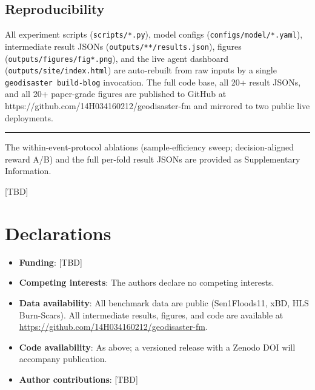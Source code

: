\documentclass[sn-nature,lineno]{sn-jnl}
\theoremstyle{thmstyleone}
\theoremstyle{thmstyletwo}
\theoremstyle{thmstylethree}
\begin{document}
\subsection{Reproducibility}\label{reproducibility}

All experiment scripts (\texttt{scripts/*.py}), model configs (\texttt{configs/model/*.yaml}),
intermediate result JSONs (\texttt{outputs/**/results.json}), figures
(\texttt{outputs/figures/fig*.png}), and the live agent dashboard
(\texttt{outputs/site/index.html}) are auto-rebuilt from raw inputs by a single
\texttt{geodisaster\ build-blog} invocation. The full code base, all 20+ result
JSONs, and all 20+ paper-grade figures are published to GitHub at
https://github.com/14H034160212/geodisaster-fm and mirrored to two public
live deployments.

\begin{center}\rule{0.5\linewidth}{0.5pt}\end{center}


\backmatter

The within-event-protocol ablations (sample-efficiency sweep;
decision-aligned reward A/B) and the full per-fold result JSONs are
provided as Supplementary Information.

[TBD]

\section*{Declarations}
\begin{itemize}
\item \textbf{Funding}: [TBD]
\item \textbf{Competing interests}: The authors declare no competing
  interests.
\item \textbf{Data availability}: All benchmark data are public
  (Sen1Floods11, xBD, HLS Burn-Scars). All intermediate results,
  figures, and code are available at
  \url{https://github.com/14H034160212/geodisaster-fm}.
\item \textbf{Code availability}: As above; a versioned release with a
  Zenodo DOI will accompany publication.
\item \textbf{Author contributions}: [TBD]
\end{itemize}




\end{document}
